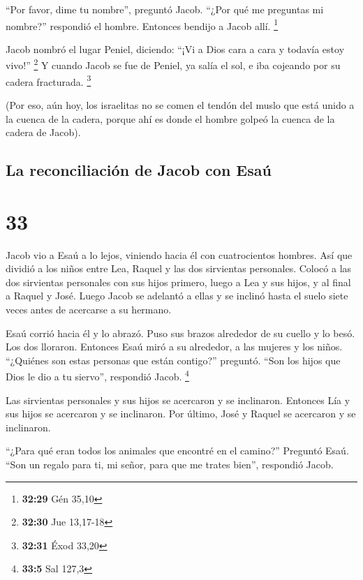  ``Por favor, dime tu nombre'', preguntó Jacob. ``¿Por
qué me preguntas mi nombre?'' respondió el hombre. Entonces bendijo a
Jacob allí. \footnote{\textbf{32:29} Gén 35,10}

 Jacob nombró el lugar Peniel, diciendo: ``¡Vi a Dios
cara a cara y todavía estoy vivo!'' \footnote{\textbf{32:30} Jue
  13,17-18}  Y cuando Jacob se fue de Peniel, ya salía el
sol, e iba cojeando por su cadera fracturada. \footnote{\textbf{32:31}
  Éxod 33,20}

 (Por eso, aún hoy, los israelitas no se comen el tendón
del muslo que está unido a la cuenca de la cadera, porque ahí es donde
el hombre golpeó la cuenca de la cadera de Jacob).

\hypertarget{la-reconciliaciuxf3n-de-jacob-con-esauxfa}{%
\subsection{La reconciliación de Jacob con
Esaú}\label{la-reconciliaciuxf3n-de-jacob-con-esauxfa}}

\hypertarget{section-32}{%
\section{33}\label{section-32}}

 Jacob vio a Esaú a lo lejos, viniendo hacia él con
cuatrocientos hombres. Así que dividió a los niños entre Lea, Raquel y
las dos sirvientas personales.  Colocó a las dos
sirvientas personales con sus hijos primero, luego a Lea y sus hijos, y
al final a Raquel y José.  Luego Jacob se adelantó a ellas
y se inclinó hasta el suelo siete veces antes de acercarse a su hermano.

 Esaú corrió hacia él y lo abrazó. Puso sus brazos
alrededor de su cuello y lo besó. Los dos lloraron. 
Entonces Esaú miró a su alrededor, a las mujeres y los niños. ``¿Quiénes
son estas personas que están contigo?'' preguntó. ``Son los hijos que
Dios le dio a tu siervo'', respondió Jacob. \footnote{\textbf{33:5} Sal
  127,3}

 Las sirvientas personales y sus hijos se acercaron y se
inclinaron.  Entonces Lía y sus hijos se acercaron y se
inclinaron. Por último, José y Raquel se acercaron y se inclinaron.

 ``¿Para qué eran todos los animales que encontré en el
camino?'' Preguntó Esaú. ``Son un regalo para ti, mi señor, para que me
trates bien'', respondió Jacob.

